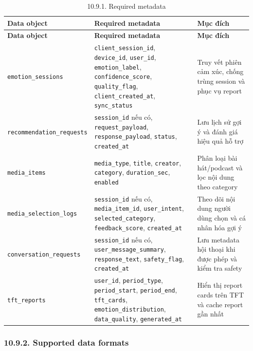 \documentclass[12pt,a4paper]{article}
\begin{document}
\begin{center}
\begin{longtable}{|P{0.25\textwidth}|P{0.32\textwidth}|P{0.33\textwidth}|}
\caption{10.9.1. Required metadata}\\
\hline
\textbf{Data object} & \textbf{Required metadata} & \textbf{Mục đích} \\
\hline
\endfirsthead
\hline
\textbf{Data object} & \textbf{Required metadata} & \textbf{Mục đích} \\
\hline
\endhead
\texttt{emotion\_sessions} & \texttt{client\_session\_id}, \texttt{device\_id}, \texttt{user\_id}, \texttt{emotion\_label}, \texttt{confidence\_score}, \texttt{quality\_flag}, \texttt{client\_created\_at}, \texttt{sync\_status} & Truy vết phiên cảm xúc, chống trùng session và phục vụ report \\
\hline
\texttt{recommendation\_requests} & \texttt{session\_id} nếu có, \texttt{request\_payload}, \texttt{response\_payload}, \texttt{status}, \texttt{created\_at} & Lưu lịch sử gợi ý và đánh giá hiệu quả hỗ trợ \\
\hline
\texttt{media\_items} & \texttt{media\_type}, \texttt{title}, \texttt{creator}, \texttt{category}, \texttt{duration\_sec}, \texttt{enabled} & Phân loại bài hát/podcast và lọc nội dung theo category \\
\hline
\texttt{media\_selection\_logs} & \texttt{session\_id} nếu có, \texttt{media\_item\_id}, \texttt{user\_intent}, \texttt{selected\_category}, \texttt{feedback\_score}, \texttt{created\_at} & Theo dõi nội dung người dùng chọn và cá nhân hóa gợi ý \\
\hline
\texttt{conversation\_requests} & \texttt{session\_id} nếu có, \texttt{user\_message\_summary}, \texttt{response\_text}, \texttt{safety\_flag}, \texttt{created\_at} & Lưu metadata hội thoại khi được phép và kiểm tra safety \\
\hline
\texttt{tft\_reports} & \texttt{user\_id}, \texttt{period\_type}, \texttt{period\_start}, \texttt{period\_end}, \texttt{tft\_cards}, \texttt{emotion\_distribution}, \texttt{data\_quality}, \texttt{generated\_at} & Hiển thị report cards trên TFT và cache report gần nhất \\
\hline
\end{longtable}
\end{center}

\subsubsection*{10.9.2. Supported data formats}
\end{document}
